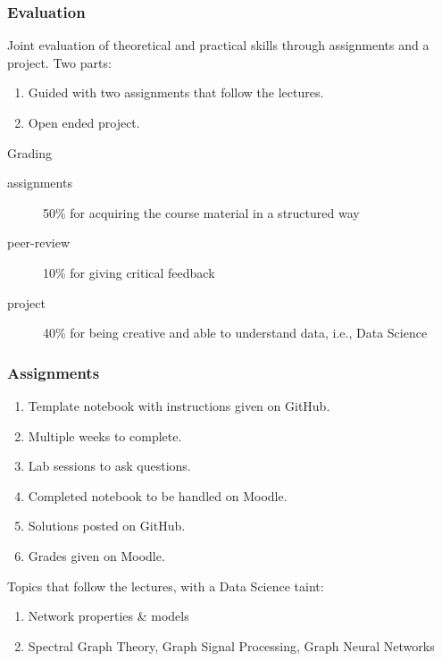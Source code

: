 \documentclass[aspectratio=169]{beamer}
\begin{document}

\begin{frame}
	\frametitle{Evaluation}
	Joint evaluation of theoretical and practical skills through assignments and a project.
	\vfill
	Two parts:
	\begin{enumerate}
		\item Guided with two assignments that follow the lectures.
		\item Open ended project.
	\end{enumerate}
	\vfill
	\begin{block}{Grading}
	\begin{description}
		\item[assignments] 50\% for acquiring the course material in a structured way
		\item[peer-review] 10\% for giving critical feedback
		\item[project] 40\% for being creative and able to understand data, i.e., Data Science
	\end{description}
	\end{block}
\end{frame}


\begin{frame}
	\frametitle{Assignments}
	\begin{enumerate}
		\item Template notebook with instructions given on GitHub.
		\item Multiple weeks to complete.
		\item Lab sessions to ask questions.
		\item Completed notebook to be handled on Moodle.
		\item Solutions posted on GitHub.
		\item Grades given on Moodle.
	\end{enumerate}
	\vfill
	Topics that follow the lectures, with a Data Science taint:
	\begin{enumerate}
		\item Network properties \& models
		\item Spectral Graph Theory, Graph Signal Processing, Graph Neural Networks
	\end{enumerate}
\end{frame}

\end{document}
